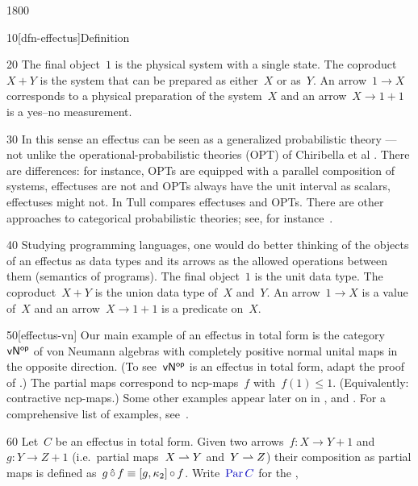 \begin{parsec}{1800}
\begin{point}{10}[dfn-effectus]{Definition}
\begin{point}{20}
    The final object~$1$ is the physical system with a single state.
The coproduct~$X+Y$ is the system that can be prepared as either~$X$ or as~$Y$.
An arrow~$1 \to X$ corresponds to a physical preparation of the system~$X$
    and an arrow~$X \to 1+1$ is a yes--no measurement.
\end{point}
\begin{point}{30}%
In this sense an effectus can be seen as a generalized
        probabilistic theory
        --- not unlike the operational-probabilistic theories (OPT)
        of Chiribella et al \cite{chiribella2010probabilistic}.
There are differences:
for instance, OPTs are equipped with a parallel composition of systems,
     effectuses are not and OPTs always have the unit interval as scalars,
     effectuses might not.
In \cite{tull2016operational} Tull compares effectuses and OPTs.
There are other approaches to categorical probabilistic theories;
 see, for instance~\cite{wilceshortcut,gogioso2017categorical}.
\end{point}
\begin{point}{40}%
Studying programming languages, one would do better thinking of
    the objects of an effectus as data types and
    its arrows as the allowed operations between them (semantics of programs).
The final object~$1$ is the unit data type.
The coproduct~$X + Y$ is the union data type of~$X$ and~$Y$.
An arrow~$1 \to X$ is a value of~$X$
    and an arrow~$X \to 1+1$ is a predicate on~$X$.
\end{point}
\begin{point}{50}[effectus-vn]%
Our main example of an effectus in total form
    is the category~${\mathsf{vN}}{^{\mathsf{op}}}$
    of von Neumann algebras with completely positive normal unital
    maps in the opposite direction.
(To see~${\mathsf{vN}}{^{\mathsf{op}}}$ is an effectus in total form,
    adapt the proof of .)
The partial maps correspond to
    ncp-maps~$f$ with~$f(1) \leq 1$.
(Equivalently: contractive ncp-maps.)
Some other examples appear later on in
    ,  and
    .
For a comprehensive list of examples, see~\cite{effintro}.
\end{point}
\begin{point}{60}%
Let~$C$ be an effectus in total form.
Given two arrows~$f\colon X \to Y+1$
and~$g \colon Y \to Z+1$ (i.e.~partial maps~$X \rightharpoonup Y$ and~$Y \rightharpoonup Z$)
    their composition as partial maps
    is defined as~$g \mathop{\hat\circ} f \equiv  [g, \kappa_2] \mathop{\circ} f$.
Write~$\Define{\Par C}$ for the ,

\end{point}
\end{point}
\end{parsec}
